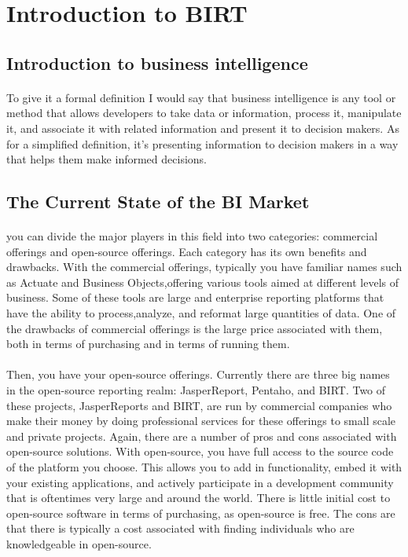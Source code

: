 \section{Introduction to BIRT}
\subsection{Introduction to business intelligence}

\paragraph{}
To give it a formal definition I would say that business intelligence is any tool or method that allows developers to take data or information, process it, manipulate it, and associate it with related information and present it to decision makers. As for a simplified definition, it's presenting information to decision makers in a way that helps them make informed decisions.

\subsection{The Current State of the BI Market}
\paragraph{}
you can divide the major players in this field into two categories: commercial offerings and open-source offerings. Each category has its own benefits and drawbacks. With the commercial offerings, typically you have familiar names such as Actuate and Business Objects,offering various tools aimed at different levels of business. Some of these tools are large and enterprise reporting platforms that have the ability to process,analyze, and reformat large quantities of data. One of the drawbacks of commercial offerings is the large price associated with them, both in terms of purchasing and in terms of running them. 

\paragraph{}
Then, you have your open-source offerings. Currently there are three big names in the open-source reporting realm: JasperReport, Pentaho, and BIRT. Two of these projects, JasperReports and BIRT, are run by commercial companies who make their money by doing professional services for these offerings to small scale and private projects. Again, there are a number of pros and cons associated with open-source solutions. With open-source, you have full access to the source code of the platform you choose. This allows you to add in functionality, embed it with your existing applications, and actively participate in a development community that is oftentimes very large and around the world. There is little initial cost to open-source software in terms of purchasing, as open-source is free. The cons are that there is typically a cost associated with finding individuals who are knowledgeable in open-source.

